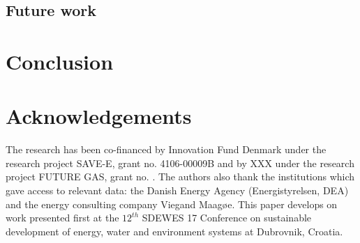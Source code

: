 \documentclass[review]{elsarticle}
\begin{document}
\subsection{Future work}


\section{Conclusion} \label{endofpaper}





\section*{Acknowledgements}
The research has been co-financed by Innovation Fund Denmark under the research project SAVE-E, grant no. 4106-00009B and by XXX under the research project FUTURE GAS, grant no. .
The authors also thank the institutions which gave access to relevant data: the Danish Energy Agency (Energistyrelsen, DEA) and the energy consulting company Viegand Maagøe.
This paper develops on work presented first at the $12^{th}$ SDEWES 17 Conference on sustainable development of energy, water and environment systems at Dubrovnik, Croatia.



\end{document}
